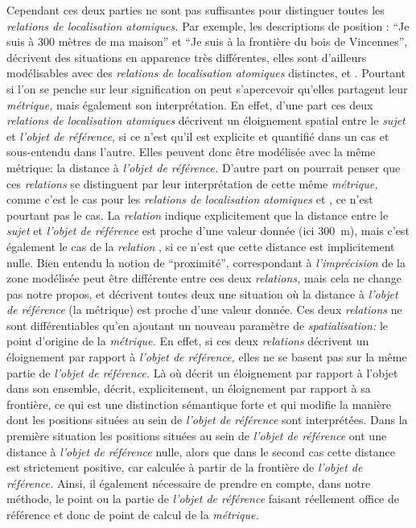 Cependant ces deux parties ne sont pas suffisantes pour distinguer
toutes les \emph{relations de localisation atomiques.} Par exemple,
les descriptions de position : \enquote{Je suis à 300 mètres de ma
  maison} et \enquote{Je suis à la frontière du bois de Vincennes},
décrivent des situations en apparence très différentes, elles sont
d'ailleurs modélisables avec des \emph{relations de localisation
  atomiques} distinctes,  et
. Pourtant si l'on se penche sur leur
signification on peut s’apercevoir qu'elles partagent leur
\emph{métrique,} mais également son interprétation. En effet, d'une
part ces deux \emph{relations de localisation atomiques} décrivent un
éloignement spatial entre le \emph{sujet} et \emph{l'objet de
  référence,} si ce n'est qu'il est explicite et quantifié dans un cas
et sous-entendu dans l'autre. Elles peuvent donc être modélisée avec
la même métrique: la distance à \emph{l'objet de référence.} D'autre
part on pourrait penser que ces \emph{relations} se distinguent par
leur interprétation de cette même \emph{métrique,} comme c'est le cas
pour les \emph{relations de localisation atomiques}
 et , ce n'est pourtant
pas le cas. La \emph{relation} 
indique explicitement que la distance entre le \emph{sujet} et
\emph{l'objet de référence} est proche d'une valeur donnée (ici
\SI{300}{\meter}), mais c'est également le cas de la \emph{relation}
, si ce n'est que cette distance est
implicitement nulle. Bien entendu la notion de \enquote{proximité},
correspondant à \emph{l'imprécision} de la zone modélisée peut être
différente entre ces deux \emph{relations,} mais cela ne change pas
notre propos,  et
 décrivent toutes deux une situation
où la distance à \emph{l'objet de référence} (\ie la métrique) est
proche d'une valeur donnée. Ces deux \emph{relations} ne sont
différentiables qu'en ajoutant un nouveau paramètre de
\emph{spatialisation:} le point d'origine de la \emph{métrique.} En
effet, si ces deux \emph{relations} décrivent un éloignement par
rapport à \emph{l'objet de référence,} elles ne se basent pas sur la
même partie de \emph{l'objet de référence.} Là où
 décrit un éloignement par rapport à
l'objet dans son ensemble,  décrit,
explicitement, un éloignement par rapport à sa frontière, ce qui est
une distinction sémantique forte et qui modifie la manière dont les
positions situées au sein de \emph{l'objet de référence} sont
interprétées. Dans la première situation les positions situées au sein
de \emph{l'objet de référence} ont une distance à \emph{l'objet de
  référence} nulle, alors que dans le second cas cette distance est
strictement positive, car calculée à partir de la frontière de
\emph{l'objet de référence.} Ainsi, il également nécessaire de prendre
en compte, dans notre méthode, le point ou la partie de \emph{l'objet
  de référence} faisant réellement office de référence et donc de
point de calcul de la \emph{métrique.}

